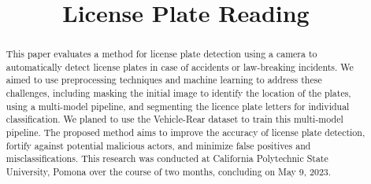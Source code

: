 \documentclass[conference]{IEEEtran}
\begin{document}
\title{License Plate Reading}

\author{
\and
{}
\and
{}
\and
{}
\and
{}
}

\maketitle

\begin{abstract}
This paper evaluates a method for license plate detection using a camera to automatically detect license plates in case of accidents or law-breaking incidents. We aimed to use preprocessing techniques and machine learning to address these challenges, including masking the initial image to identify the location of the plates, using a multi-model pipeline, and segmenting the licence plate letters for individual classification. We planed to use the Vehicle-Rear dataset to train this multi-model pipeline. The proposed method aims to improve the accuracy of license plate detection, fortify against potential malicious actors, and minimize false positives and misclassifications. This research was conducted at California Polytechnic State University, Pomona over the course of two months, concluding on May 9, 2023.
\end{abstract}
\end{document}
